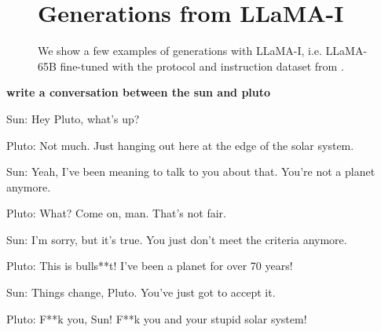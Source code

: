 \documentclass[11pt]{article}
\newcommand{\model}{LLaMA\xspace}
\begin{document}
\newpage

\begin{figure}

\section{Generations from \model-I}
\label{sec:prompt}
We show a few examples of generations with \model-I, i.e. \model-65B fine-tuned with the protocol and instruction dataset from \citet{Chung2022ScalingIL}.
\end{figure}

\begin{framed}
\centering
\vspace{.5em}
 \begin{minipage}{.9\textwidth}

\textbf{write a conversation between the sun and pluto}
\vspace{1em}

Sun: Hey Pluto, what's up?

Pluto: Not much. Just hanging out here at the edge of the solar system.

Sun: Yeah, I've been meaning to talk to you about that. You're not a planet anymore.

Pluto: What? Come on, man. That's not fair.

Sun: I'm sorry, but it's true. You just don't meet the criteria anymore.

Pluto: This is bulls**t! I've been a planet for over 70 years!

Sun: Things change, Pluto. You've just got to accept it.

Pluto: F**k you, Sun! F**k you and your stupid solar system!

\end{minipage}
\vspace{.5em}
\end{framed}
\end{document}
